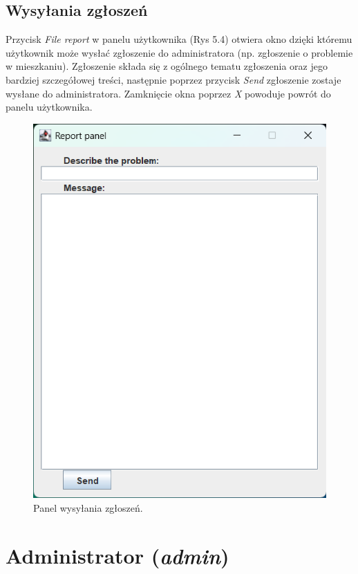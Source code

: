 \subsection{Wysyłania zgłoszeń}
Przycisk \textit{File report} w panelu użytkownika (Rys 5.4) otwiera okno dzięki któremu użytkownik może wysłać zgłoszenie do administratora 
(np. zgłoszenie o problemie w mieszkaniu). Zgłoszenie składa się z ogólnego tematu zgłoszenia oraz jego bardziej szczegółowej treści, następnie 
poprzez przycisk \textit{Send} zgłoszenie zostaje wysłane do administratora. Zamknięcie okna poprzez \textit{X} powoduje powrót do panelu użytkownika.
\begin{figure}[H]
    \centering
    \includegraphics[width=\textwidth,height=0.5\textheight,keepaspectratio]{figures/app-images/user-file-report.eps}
    \caption{Panel wysyłania zgłoszeń.\label{fig10}}
\end{figure}

\newpage
\section{Administrator (\textit{admin})}
